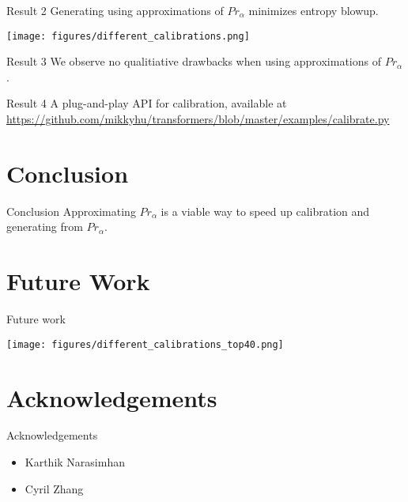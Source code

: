 \documentclass{beamer}
\begin{document}
\begin{frame}{Result 2}
    Generating using approximations of $Pr_\alpha$ minimizes entropy blowup.
    \begin{center}
        \texttt{[image: figures/different\_calibrations.png]}
    \end{center}
\end{frame}

\begin{frame}{Result 3}
    We observe no qualitiative drawbacks when using approximations of $Pr_\alpha$.
\end{frame}

\begin{frame}{Result 4}
    A plug-and-play API for calibration, available at \url{https://github.com/mikkyhu/transformers/blob/master/examples/calibrate.py}
\end{frame}

\section{Conclusion}
\begin{frame}{Conclusion}
    Approximating $Pr_\alpha$ is a viable way to speed up calibration and generating from $Pr_\alpha$.
\end{frame}

\section{Future Work}
\begin{frame}{Future work}
    \begin{center}
        \texttt{[image: figures/different\_calibrations\_top40.png]}
    \end{center}
\end{frame}

\section{Acknowledgements}
\begin{frame}{Acknowledgements}
    \begin{itemize}
        \item Karthik Narasimhan
        \item Cyril Zhang
    \end{itemize}
    
    
\end{frame}
\end{document}
